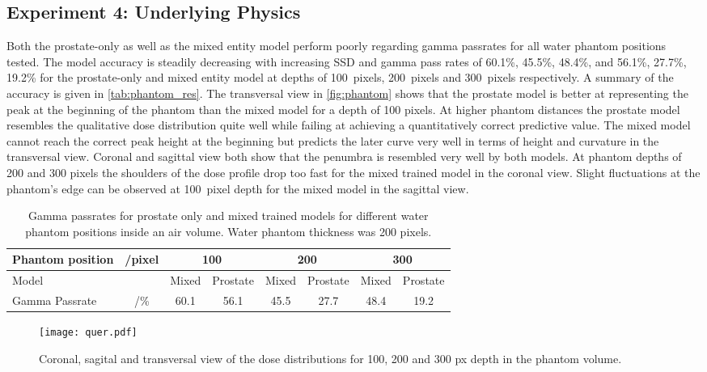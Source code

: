 \subsection{Experiment 4: Underlying Physics}

Both the prostate-only as well as the mixed entity model perform poorly regarding gamma passrates for all water phantom positions tested. 
The model accuracy is steadily decreasing with increasing \acs{SSD} and gamma pass rates of 60.1\%, 45.5\%, 48.4\%, and 56.1\%, 27.7\%, 19.2\% for the prostate-only and mixed entity model at depths of 100~pixels, 200~pixels and 300~pixels respectively. A summary of the accuracy is given in \autoref{tab:phantom_res}. 
The transversal view in \autoref{fig:phantom} shows that the prostate model is better at representing the peak at the beginning of the phantom than the mixed model for a depth of 100 pixels. 
At higher phantom distances the prostate model resembles the qualitative dose distribution quite well while failing at achieving a quantitatively correct predictive value. 
The mixed model cannot reach the correct peak height at the beginning but predicts the later curve very well in terms of height and curvature in the transversal view. 
Coronal and sagittal view both show that the penumbra is resembled very well by both models. 
At phantom depths of 200 and 300 pixels the shoulders of the dose profile drop too fast for the mixed trained model in the coronal view.
Slight fluctuations at the phantom's edge can be observed at 100~pixel depth for the mixed model in the sagittal view.
 
\begin{table}
    \begin{tabular}{|lc|cc|cc|cc|}
    \hline
    Phantom position & /pixel & \multicolumn{2}{c|}{\textbf{100}} & \multicolumn{2}{c|}{\textbf{200}} & \multicolumn{2}{c|}{\textbf{300}} \\ \hline
    Model               &        & Mixed          & Prostate         & Mixed          & Prostate         & Mixed          & Prostate         \\
    Gamma Passrate      & /\%    & 60.1         & 56.1           & 45.5         & 27.7           & 48.4         & 19.2           \\ \hline
    \end{tabular}
    \caption{Gamma passrates for prostate only and mixed trained models for different water phantom positions inside an air volume. Water phantom thickness was 200 pixels.}\label{tab:phantom_res}
\end{table}

\begin{figure}[htb]
    \centering
    \texttt{[image: quer.pdf]}
    \caption{Coronal, sagital and transversal view of the dose distributions for 100, 200 and 300 px depth in the phantom volume.}\label{fig:phantom}
\end{figure}